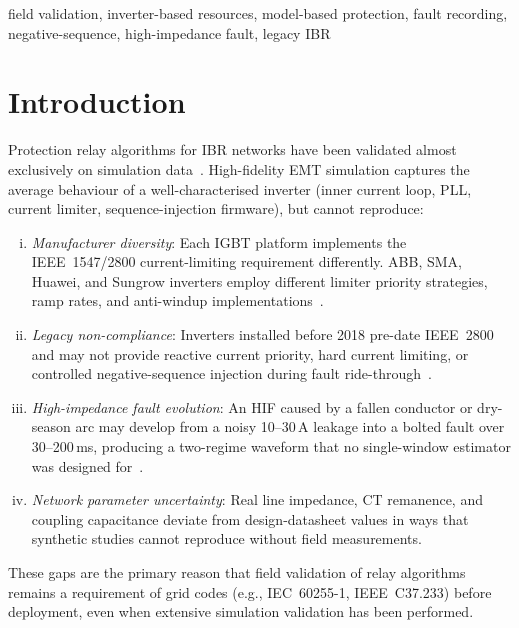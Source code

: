 \documentclass[journal]{IEEEtran}
\begin{document}
\begin{IEEEkeywords}
field validation, inverter-based resources, model-based protection,
fault recording, negative-sequence, high-impedance fault, legacy IBR
\end{IEEEkeywords}

\section{Introduction}
\label{sec:intro}

Protection relay algorithms for IBR networks have been validated
almost exclusively on simulation data~\cite{Telukunta2017,Hooshyar2019,
Plet2011,Viehweider2011}.  High-fidelity EMT simulation captures the
average behaviour of a well-characterised inverter (inner current loop,
PLL, current limiter, sequence-injection firmware), but cannot reproduce:
\begin{enumerate}[(i)]
  \item \emph{Manufacturer diversity}: Each IGBT platform implements
        the IEEE~1547/2800 current-limiting requirement differently.
        ABB, SMA, Huawei, and Sungrow inverters employ different
        limiter priority strategies, ramp rates, and anti-windup
        implementations~\cite{Guo2020IBRdiversity,Liao2022DNN}.
  \item \emph{Legacy non-compliance}: Inverters installed before 2018
        pre-date IEEE~2800 and may not provide reactive current
        priority, hard current limiting, or controlled negative-sequence
        injection during fault ride-through~\cite{Urdaneta2020legacy}.
  \item \emph{High-impedance fault evolution}: An HIF caused by
        a fallen conductor or dry-season arc may develop from a
        noisy 10--30\,A leakage into a bolted fault over
        30--200\,ms, producing a two-regime waveform that no
        single-window estimator was designed for~\cite{Ghaderi2017HIF}.
  \item \emph{Network parameter uncertainty}: Real line impedance,
        CT remanence, and coupling capacitance deviate from
        design-datasheet values in ways that synthetic studies
        cannot reproduce without field measurements.
\end{enumerate}

These gaps are the primary reason that field validation of relay
algorithms remains a requirement of grid codes (e.g., IEC~60255-1,
IEEE~C37.233) before deployment, even when extensive simulation
validation has been performed.
\end{document}
